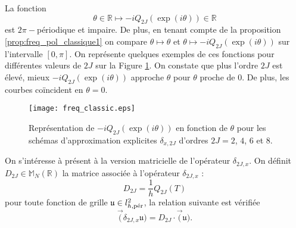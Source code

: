 La fonction
\begin{equation}
\theta \in \mathbb{R} \mapsto - i Q_{2J}(\exp(i \theta)) \in \mathbb{R}
\end{equation}
est $2 \pi -$périodique et impaire. De plus, en tenant compte de la proposition \ref{prop:freq_pol_classique1} on compare $\theta \mapsto \theta$  et $\theta \mapsto - i Q_{2J}(\exp(i \theta))$ sur l'intervalle $[0,\pi]$. On représente quelques exemples de ces fonctions pour différentes valeurs de $2J$ sur la Figure \ref{fig:freq_classic}. On constate que plus l'ordre $2J$ est élevé, mieux $- i Q_{2J}(\exp(i \theta))$ approche $\theta$ pour $\theta$ proche de $0$. De plus, les courbes coïncident en $\theta = 0$.

\begin{figure}[htbp]
\begin{center}
\texttt{[image: freq\_classic.eps]}
\end{center}
\caption{Représentation de $-i Q_{2J}\left( \exp(i \theta) \right)$ en fonction de $\theta$ pour les schémas d'approximation explicites $\delta_{x,2J}$ d'ordres $2J = 2$, $4$, $6$ et $8$.}
\label{fig:freq_classic}
\end{figure}

On s'intéresse à présent à la version matricielle de l'opérateur $\delta_{2J,x}$. On définit $D_{2J} \in \mathbb{M}_N(\mathbb{R})$ la matrice associée à l'opérateur $\delta_{2J,x}$ :
\begin{equation}
D_{2J} = \dfrac{1}{h} Q_{2J}(T)
\label{eq:matrice_explicite}
\end{equation}
pour toute fonction de grille $\mathfrak{u} \in l^2_{h,\per}$, la relation suivante est vérifiée
\begin{equation}
\vec(\delta_{2J,x} \mathfrak{u}) = D_{2J} \cdot \vec ( \mathfrak{u} ).
\end{equation}

